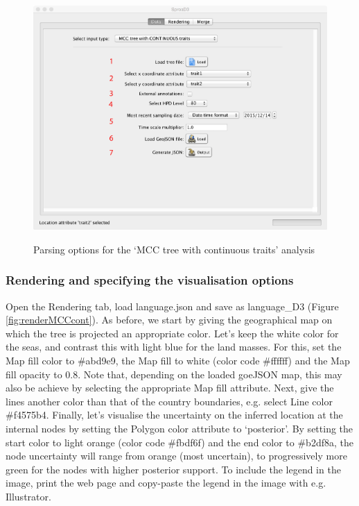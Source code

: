 \documentclass[english]{paper}
\begin{document}
\begin{figure}[!H]
\centering
\includegraphics[width=1\textwidth]{./figures/Fig3_parse.pdf} %
\label{fig:parseMCCcont}
\caption{Parsing options for the `MCC tree with continuous traits' analysis}
\end{figure}

\subsubsection{Rendering and specifying the visualisation options}

Open the Rendering tab, load language.json and save as language\_D3 (Figure \ref{fig:renderMCCcont}).
As before, we start by giving the geographical map on which the tree is projected an appropriate color. 
Let's keep the white color for the seas, and contrast this with light blue for the land masses. %
For this, set the Map fill color to \#abd9e9, the Map fill to white (color code \#ffffff) and the Map fill opacity to 0.8. 
Note that, depending on the loaded goeJSON map, this may also be achieve by selecting the appropriate Map fill attribute. 
Next, give the lines another color than that of the country boundaries, e.g. select Line color \#f4575b4.
Finally, let's visualise the uncertainty on the inferred location at the internal nodes by setting the Polygon color attribute to `posterior'.
By setting the start color to light orange (color code \#fbdf6f) and the end color to \#b2df8a, the node uncertainty will range from orange (most uncertain), to progressively more green for the nodes with higher posterior support.
To include the legend in the image, print the web page and copy-paste the legend in the image with e.g. Illustrator. 
\end{document}
